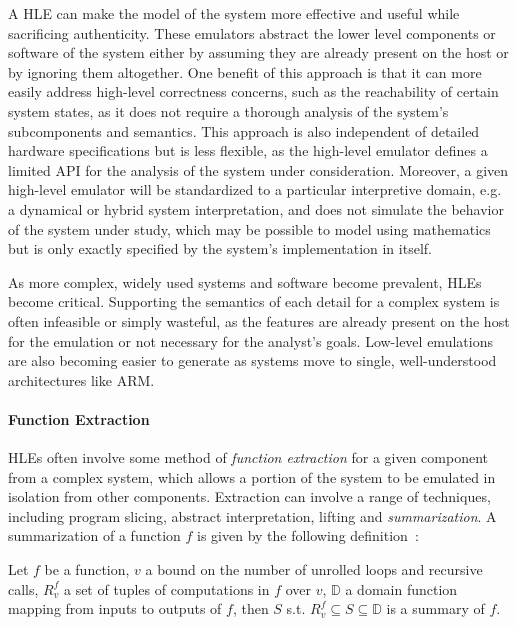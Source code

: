 A HLE can make the model of the system more effective and useful while sacrificing authenticity.
These emulators abstract the lower level components or software of the system either by assuming they are already present on the host or by ignoring them altogether.
One benefit of this approach is that it can more easily address high-level correctness concerns, such as the reachability of certain system states, as it does not require a thorough analysis of the system's subcomponents and semantics.
This approach is also independent of detailed hardware specifications but is less flexible, as the high-level emulator defines a limited API for the analysis of the system under consideration.
Moreover, a given high-level emulator will be standardized to a particular interpretive domain, e.g. a dynamical or hybrid system interpretation, and does not simulate the behavior of the system under study, which may be possible to model using mathematics but is only exactly specified by the system's implementation in itself.

As more complex, widely used systems and software become prevalent, HLEs become critical.
Supporting the semantics of each detail for a complex system is often infeasible or simply wasteful, as the features are already present on the host for the emulation or not necessary for the analyst's goals.
Low-level emulations are also becoming easier to generate as systems move to single, well-understood architectures like ARM.

\paragraph{Function Extraction}
HLEs often involve some method of \emph{function extraction} for a given component from a complex system, which allows a portion of the system to be emulated in isolation from other components.
Extraction can involve a range of techniques, including program slicing, abstract interpretation, lifting and \emph{summarization}.
A summarization of a function $f$ is given by the following definition~\cite{interpolation}:

\begin{definition}
\label{def:summarization}
Let $f$ be a function, $v$ a bound on the number of unrolled loops and recursive calls, $R_{v}^{f}$ a set of tuples of computations in $f$ over $v$, $\mathbb{D}$ a domain function mapping from inputs to outputs of $f$, then $S$ s.t. $R_{v}^{f} \subseteq S \subseteq \mathbb{D}$ is a summary of $f$.
\end{definition}

